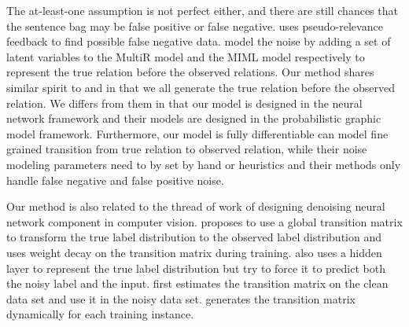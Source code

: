 The at-least-one assumption is not perfect either, and there are still chances that the sentence bag may be false positive or false negative.  \cite{xu2013filling} uses pseudo-relevance feedback to find possible false negative data. \cite{ritter2013modeling,min2013distant} model the noise by adding a set of latent variables to the MultiR model \cite{hoffmann2011knowledge} and the MIML model \cite{surdeanu2012multi} respectively to represent the true relation before the observed relations. Our method shares similar spirit to \cite{ritter2013modeling} and \cite{min2013distant} in that we all generate the true relation before the observed relation. We differs from them in that our model is designed in the neural network framework and their models are designed in the probabilistic graphic model framework. Furthermore, our model is fully differentiable can model fine grained transition from true relation to observed relation, while their noise modeling parameters need to by set by hand or heuristics and their methods only handle false negative and false positive noise.





Our method is also related to the thread of work of designing denoising neural network component in computer vision.  \cite{sukhbaatar2014training} proposes to use a global transition matrix to transform the true label distribution to the observed label distribution and uses weight decay on the transition matrix during training. \cite{reed2014training} also uses a hidden layer to represent the true label distribution but try to force it to predict both the noisy label and the input. \cite{chen2015webly,xiao2015learning} first estimates the transition matrix on the clean data set and use it in the noisy data set. \cite{misra2016seeing} generates the transition matrix dynamically for each training instance. 

